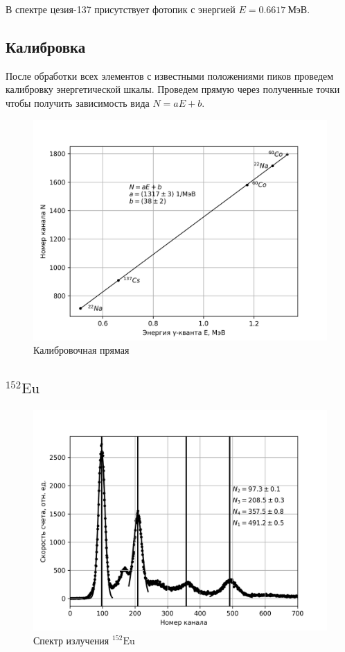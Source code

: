 \documentclass[14pt, a4paper]{report}
\begin{document}
В спектре цезия-137 присутствует фотопик с энергией $E=0.6617\ \text{МэВ}$.

\subsection{Калибровка}

После обработки всех элементов с известными положениями пиков проведем калибровку энергетической шкалы. Проведем прямую через полученные точки чтобы получить зависимость вида $N=aE+b$.

\begin{figure}[H]
\centering
\includegraphics[width=.7\textwidth]{../images/555-cal}
\caption{Калибровочная прямая}
\end{figure}

\subsection{$^{152}\text{Eu}$}

\begin{figure}[H]
\centering
\includegraphics[width=.7\textwidth]{../images/555-eu152}
\caption{Спектр излучения $^{152}\text{Eu}$}
\end{figure}
\end{document}

